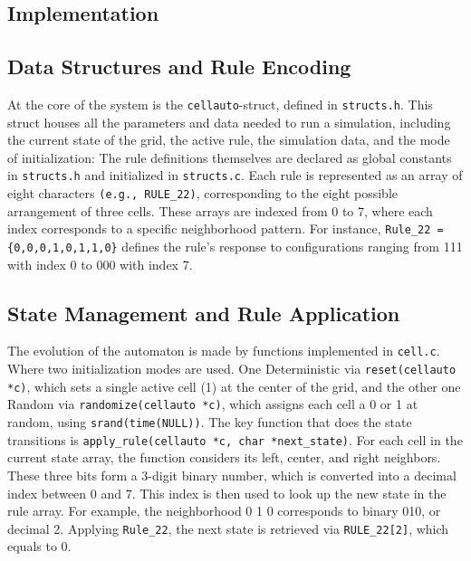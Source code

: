 \documentclass[12pt,a4paper]{article}
\begin{document}
\vspace{1cm}


\subsection{Implementation}
\subsection*{\small Data Structures and Rule Encoding}
At the core of the system is the \texttt{cellauto}-struct, defined in \texttt{structs.h}. This struct houses all the 
parameters and data needed to run a simulation, including the current state of the grid, the active rule, 
the simulation data, and the mode of initialization:
\newline
The rule definitions themselves are declared as global constants in \texttt{structs.h} and initialized in \texttt{structs.c}. 
Each rule is represented as an array of eight characters \texttt{(e.g., RULE\_22)}, corresponding to the eight possible 
arrangement of three cells. These arrays are indexed from 0 to 7, where each index corresponds to a specific 
neighborhood pattern. For instance, \texttt{Rule\_22 = \{0,0,0,1,0,1,1,0\}} defines the rule's response to configurations 
ranging from 111 with index 0 to 000 with index 7. 
\newline

\subsection*{\small State Management and Rule Application}
The evolution of the automaton is made by functions implemented in \texttt{cell.c}. Where two initialization modes are used. 
One Deterministic via \texttt{reset(cellauto *c)}, which sets a single active cell (1) at the center of the grid, and the other 
one Random via \texttt{randomize(cellauto *c)}, which assigns each cell a 0 or 1 at random, using \texttt{srand(time(NULL))}.
\newline
The key function that does the state transitions is \texttt{apply\_rule(cellauto *c, char *next\_state)}. For each cell in the 
current state array, the function considers its left, center, and right neighbors. These three bits form a 3-digit 
binary number, which is converted into a decimal index between 0 and 7. This index is then used to look up the new 
state in the rule array. For example, the neighborhood 0 1 0 corresponds to binary 010, or decimal 2. Applying \texttt{Rule\_22}, 
the next state is retrieved via \texttt{RULE\_22[2]}, which equals to 0.
\newline
\end{document}
